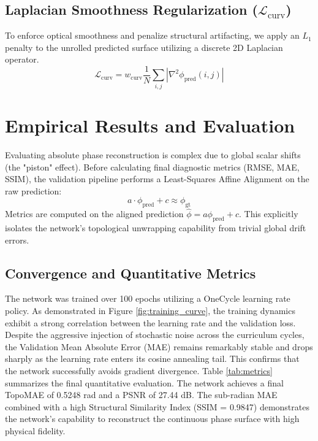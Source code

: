 \documentclass[11pt,onecolumn]{IEEEtran}
\begin{document}
\subsection{Laplacian Smoothness Regularization ($\mathcal{L}_{\text{curv}}$)}
To enforce optical smoothness and penalize structural artifacting, we apply an $L_1$ penalty to the unrolled predicted surface utilizing a discrete 2D Laplacian operator.
\begin{equation}
  \mathcal{L}_{\text{curv}} = w_{\text{curv}} \frac{1}{N} \sum_{i,j} \left| \nabla^2 \phi_{\text{pred}}(i,j) \right|
\end{equation}

\section{Empirical Results and Evaluation}
Evaluating absolute phase reconstruction is complex due to global scalar shifts (the "piston" effect). Before calculating final diagnostic metrics (RMSE, MAE, SSIM), the validation pipeline performs a Least-Squares Affine Alignment on the raw prediction:
\begin{equation}
  a \cdot \phi_{\text{pred}} + c \approx \phi_{\text{gt}}
\end{equation}
Metrics are computed on the aligned prediction $\hat{\phi} = a\phi_{\text{pred}} + c$. This explicitly isolates the network's topological unwrapping capability from trivial global drift errors.

\subsection{Convergence and Quantitative Metrics}
The network was trained over 100 epochs utilizing a OneCycle learning rate policy. As demonstrated in Figure \ref{fig:training_curve}, the training dynamics exhibit a strong correlation between the learning rate and the validation loss. Despite the aggressive injection of stochastic noise across the curriculum cycles, the Validation Mean Absolute Error (MAE) remains remarkably stable and drops sharply as the learning rate enters its cosine annealing tail. This confirms that the network successfully avoids gradient divergence. Table \ref{tab:metrics} summarizes the final quantitative evaluation. The network achieves a final TopoMAE of 0.5248 rad and a PSNR of 27.44 dB. The sub-radian MAE combined with a high Structural Similarity Index (SSIM = 0.9847) demonstrates the network's capability to reconstruct the continuous phase surface with high physical fidelity.
\end{document}
